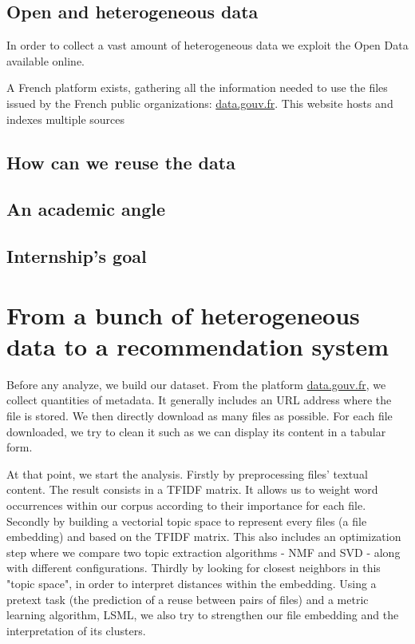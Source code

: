 \documentclass[a4paper]{article}
\begin{document}
	\subsection{Open and heterogeneous data}
	
	In order to collect a vast amount of heterogeneous data we exploit the Open Data available online.
	
	
	A French platform exists, gathering all the information needed to use the files issued by the French public organizations: \href{http://www.data.gouv.fr/fr/}{data.gouv.fr}. This website hosts and indexes multiple sources
	
	\subsection{How can we reuse the data}
	
	
	\subsection{An academic angle}
	
	\subsection{Internship's goal}
	
	\section{From a bunch of heterogeneous data to a recommendation system}
	
	Before any analyze, we build our dataset. From the platform \href{http://www.data.gouv.fr/fr/}{data.gouv.fr}, we collect quantities of metadata. It generally includes an URL address where the file is stored. We then directly download as many files as possible. For each file downloaded, we try to clean it such as we can display its content in a tabular form.
	
	At that point, we start the analysis. Firstly by preprocessing files' textual content. The result consists in a \ac{TFIDF} matrix. It allows us to weight word occurrences within our corpus according to their importance for each file. Secondly by building a vectorial topic space to represent every files (a file embedding) and based on the \ac{TFIDF} matrix. This also includes an optimization step where we compare two topic extraction algorithms - \ac{NMF} and \ac{SVD} - along with different configurations. Thirdly by looking for closest neighbors in this "topic space", in order to interpret distances within the embedding. Using a pretext task (the prediction of a reuse between pairs of files) and a metric learning algorithm, \ac{LSML}, we also try to strengthen our file embedding and the interpretation of its clusters.
	
\end{document}
